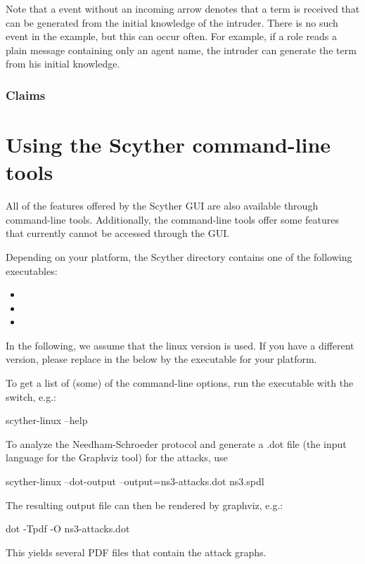 \documentclass{book}
\begin{document}
Note that a  event without an incoming arrow denotes that a term is
received that can be generated from the initial knowledge of the intruder.
There is no such event in the example, but this can occur often. For
example, if a role reads a plain message containing only an agent name,
the intruder can generate the term from his initial knowledge.

\subsection{Claims}

\chapter{Using the Scyther command-line tools}
\label{sec:cli}

All of the features offered by the Scyther GUI are also available
through command-line tools. Additionally, the command-line tools offer
some features that currently cannot be accessed through the GUI.

Depending on your platform, the Scyther directory contains one of the following executables:
\begin{itemize}
  \item {}
  \item {}
  \item {}
\end{itemize}
In the following, we assume that the linux version is used. If you have a different version, please replace  in the below by the executable for your platform.

To get a list of (some) of the command-line options, run the executable with the  switch, e.g.:
\begin{screen}
scyther-linux --help
\end{screen}
To analyze the Needham-Schroeder protocol and generate a .dot file (the input language for the Graphviz tool) for the attacks, use
\begin{screen}
scyther-linux --dot-output --output=ns3-attacks.dot ns3.spdl
\end{screen}
The resulting output file can then be rendered by graphviz, e.g.:
\begin{screen}
dot -Tpdf -O ns3-attacks.dot 
\end{screen}
This yields several PDF files  that contain the attack graphs.
\end{document}
